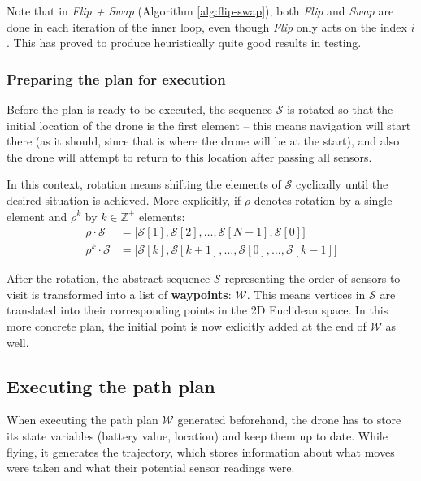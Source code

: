 \documentclass{article}
\begin{document}
Note that in \textit{Flip + Swap} (Algorithm \ref{alg:flip-swap}), both \textit{Flip} and \textit{Swap} are done in each iteration of the inner loop, even though \textit{Flip} only acts on the index $i$. This has proved to produce heuristically quite good results in testing.

\subsubsection{Preparing the plan for execution}

Before the plan is ready to be executed, the sequence $\mathcal{S}$ is rotated so that the initial location of the drone is the first element -- this means navigation will start there (as it should, since that is where the drone will be at the start), and also the drone will attempt to return to this location after passing all sensors.

In this context, rotation means shifting the elements of $\mathcal{S}$ cyclically until the desired situation is achieved. More explicitly, if $\rho$ denotes rotation by a single element and $\rho^k$ by $k\in\mathbb{Z}^{+}$ elements:
\begin{align*}
  \rho\cdot \mathcal{S} & = \big[ \mathcal{S}[1], \mathcal{S}[2], \dots, \mathcal{S}[N-1], \mathcal{S}[0] \big] \\
  \rho^k \cdot \mathcal{S} & = \big[ \mathcal{S}[k], \mathcal{S}[k+1], \dots, \mathcal{S}[0], \dots, \mathcal{S}[k-1] \big]
\end{align*}

After the rotation, the abstract sequence $\mathcal{S}$ representing the order of sensors to visit is transformed into a list of \textbf{waypoints}: $\mathcal{W}$. This means vertices in $\mathcal{S}$ are translated into their corresponding points in the 2D Euclidean space. In this more concrete plan, the initial point is now exlicitly added at the end of $\mathcal{W}$ as well.

\subsection{Executing the path plan}

When executing the path plan $\mathcal{W}$ generated beforehand, the drone has to store its state variables (battery value, location) and keep them up to date. While flying, it generates the trajectory, which stores information about what moves were taken and what their potential sensor readings were.
\end{document}
